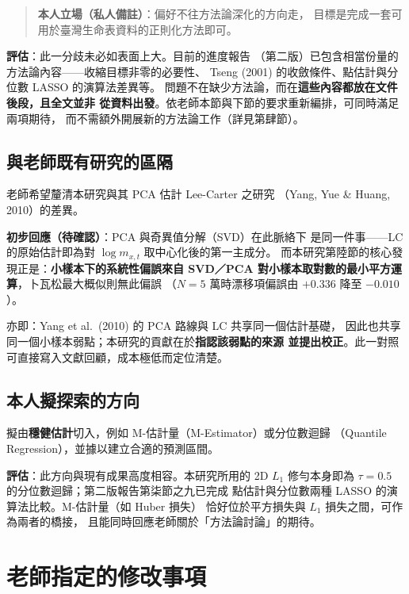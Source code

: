 \documentclass[UTF8, fontset=macnew, a4paper, 12pt]{ctexart}
\begin{document}
\vspace{4pt}
\begin{quote}\small
\textbf{本人立場（私人備註）}：偏好不往方法論深化的方向走，
目標是完成一套可用於臺灣生命表資料的正則化方法即可。
\end{quote}
\vspace{4pt}

\noindent\textbf{評估}：此一分歧未必如表面上大。目前的進度報告
（第二版）已包含相當份量的方法論內容——收縮目標非零的必要性、
Tseng (2001) 的收斂條件、點估計與分位數 LASSO 的演算法差異等。
問題不在缺少方法論，而在\textbf{這些內容都放在文件後段，且全文並非
從資料出發}。依老師本節與下節的要求重新編排，可同時滿足兩項期待，
而不需額外開展新的方法論工作（詳見第肆節）。

\subsection{與老師既有研究的區隔}

老師希望釐清本研究與其 PCA 估計 Lee-Carter 之研究
（Yang, Yue \& Huang, 2010）的差異。

\noindent\textbf{初步回應（待確認）}：PCA 與奇異值分解（SVD）在此脈絡下
是同一件事——LC 的原始估計即為對 $\log m_{x,t}$ 取中心化後的第一主成分。
而本研究第陸節的核心發現正是：\textbf{小樣本下的系統性偏誤來自
SVD／PCA 對小樣本取對數的最小平方運算}，卜瓦松最大概似則無此偏誤
（$N=5$ 萬時漂移項偏誤由 $+0.336$ 降至 $-0.010$）。

\noindent 亦即：Yang et al.\ (2010) 的 PCA 路線與 LC 共享同一個估計基礎，
因此也共享同一個小樣本弱點；本研究的貢獻在於\textbf{指認該弱點的來源
並提出校正}。此一對照可直接寫入文獻回顧，成本極低而定位清楚。

\subsection{本人擬探索的方向}

擬由\textbf{穩健估計}切入，例如 M-估計量（M-Estimator）或分位數迴歸
（Quantile Regression），並據以建立合適的預測區間。

\noindent\textbf{評估}：此方向與現有成果高度相容。本研究所用的 2D $L_1$
修勻本身即為 $\tau=0.5$ 的分位數迴歸；第二版報告第柒節之九已完成
點估計與分位數兩種 LASSO 的演算法比較。M-估計量（如 Huber 損失）
恰好位於平方損失與 $L_1$ 損失之間，可作為兩者的橋接，
且能同時回應老師關於「方法論討論」的期待。

\section{老師指定的修改事項}
\end{document}
